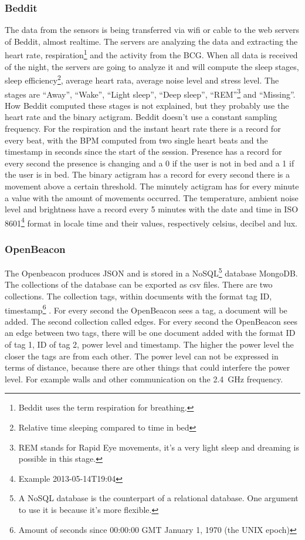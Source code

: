 		\subsubsection{Beddit}
		\label{sec:datadescriptionbeddit}
		The data from the sensors is being transferred via wifi or cable to the web servers of Beddit, almost realtime. The servers are analyzing the data and extracting the heart rate, respiration\footnote{Beddit uses the term respiration for breathing.} and the activity from the BCG. When all data is received of the night, the servers are going to analyze it and will compute the sleep stages, sleep efficiency\footnote{Relative time sleeping compared to time in bed}, average heart rata, average noise level and stress level. The stages are ``Away'', ``Wake'', ``Light sleep'', ``Deep sleep'', ``REM''\footnote{REM stands for Rapid Eye movements, it's a very light sleep and dreaming is possible in this stage.} and ``Missing''. How Beddit computed these stages is not explained, but they probably use the heart rate and the binary actigram. Beddit doesn't use a constant sampling frequency. For the respiration and the instant heart rate there is a record for every beat, with the BPM computed from two single heart beats and the timestamp in seconds since the start of the session. Presence has a record for every second the presence is changing and a 0 if the user is not in bed and a 1 if the user is in bed. The binary actigram has a record for every second there is a movement above a certain threshold. The minutely actigram has for every minute a value with the amount of movements occurred. The temperature, ambient noise level and brightness have a record every 5 minutes with the date and time in ISO 8601\footnote{Example 2013-05-14T19:04\cite{iso8601}} format in locale time and their values, respectively celsius, decibel and lux.

		\subsubsection{OpenBeacon}
			The Openbeacon produces JSON and is stored in a NoSQL\footnote{A NoSQL database is the counterpart of a relational database. One argument to use it is because it's more flexible.} database MongoDB. The collections of the database can be exported as csv files.
			There are two collections. The collection tags, within documents with the format tag ID, timestamp\footnote{Amount of seconds since 00:00:00 GMT January 1, 1970 (the UNIX epoch)} . For every second the OpenBeacon sees a tag, a document will be added.
			The second collection called edges. For every second the OpenBeacon sees an edge between two tags, there will be one document added with the format ID of tag 1, ID of tag 2, power level and timestamp.
			The higher the power level the closer the tags are from each other. The power level can not be expressed in terms of distance, because there are other things that could interfere the power level. For example walls and other communication on the \SI{2.4}{\giga\hertz} frequency.
